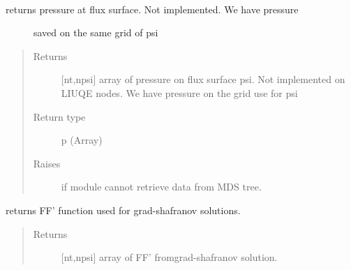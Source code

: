 \documentclass[letterpaper,10pt,english]{sphinxmanual}
\begin{document}
\begin{fulllineitems}
\begin{fulllineitems}
\begin{quote}
\begin{description}
\end{description}\end{quote}

\end{fulllineitems}


\begin{fulllineitems}
\label{\detokenize{eqtools:eqtools.TCVLIUQE.TCVLIUQETree.getFluxPres}}~\begin{description}
\item[{returns pressure at flux surface. Not implemented. We have pressure}] \leavevmode
saved on the same grid of psi

\end{description}
\begin{quote}\begin{description}
\item[{Returns}] \leavevmode
{[}nt,npsi{]} array of pressure on flux surface psi.
Not implemented on LIUQE nodes. We have pressure on the grid use for psi

\item[{Return type}] \leavevmode
p (Array)

\item[{Raises}] \leavevmode
{} \textendash{} if module cannot retrieve data from MDS tree.

\end{description}\end{quote}

\end{fulllineitems}


\begin{fulllineitems}
\label{\detokenize{eqtools:eqtools.TCVLIUQE.TCVLIUQETree.getFFPrime}}
returns FF’ function used for grad-shafranov solutions.
\begin{quote}\begin{description}
\item[{Returns}] \leavevmode
{[}nt,npsi{]} array of FF’ fromgrad-shafranov solution.


\end{description}
\end{quote}
\end{fulllineitems}
\end{fulllineitems}
\end{document}
